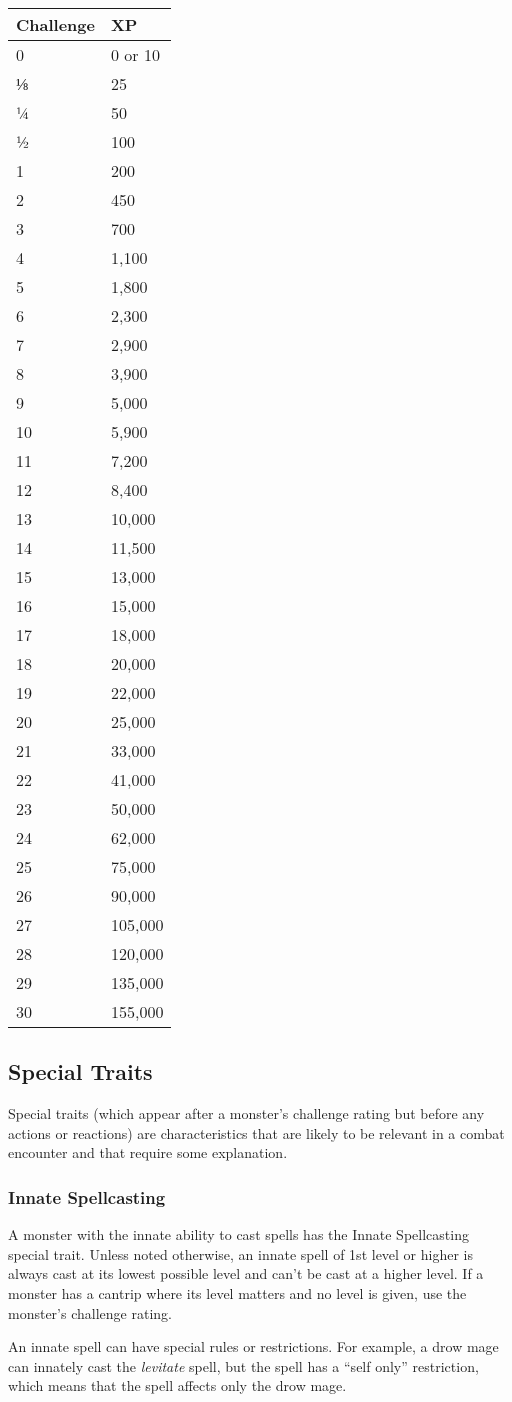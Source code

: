 \documentclass[
]{article}
\begin{document}
\begin{longtable}[]{@{}ll@{}}
\toprule
Challenge & XP\tabularnewline
\midrule
\endhead
0 & 0 or 10\tabularnewline
⅛ & 25\tabularnewline
¼ & 50\tabularnewline
½ & 100\tabularnewline
1 & 200\tabularnewline
2 & 450\tabularnewline
3 & 700\tabularnewline
4 & 1,100\tabularnewline
5 & 1,800\tabularnewline
6 & 2,300\tabularnewline
7 & 2,900\tabularnewline
8 & 3,900\tabularnewline
9 & 5,000\tabularnewline
10 & 5,900\tabularnewline
11 & 7,200\tabularnewline
12 & 8,400\tabularnewline
13 & 10,000\tabularnewline
14 & 11,500\tabularnewline
15 & 13,000\tabularnewline
16 & 15,000\tabularnewline
17 & 18,000\tabularnewline
18 & 20,000\tabularnewline
19 & 22,000\tabularnewline
20 & 25,000\tabularnewline
21 & 33,000\tabularnewline
22 & 41,000\tabularnewline
23 & 50,000\tabularnewline
24 & 62,000\tabularnewline
25 & 75,000\tabularnewline
26 & 90,000\tabularnewline
27 & 105,000\tabularnewline
28 & 120,000\tabularnewline
29 & 135,000\tabularnewline
30 & 155,000\tabularnewline
\bottomrule
\end{longtable}

\hypertarget{special-traits}{%
\subsection{Special Traits}\label{special-traits}}

Special traits (which appear after a monster's challenge rating but
before any actions or reactions) are characteristics that are likely to
be relevant in a combat encounter and that require some explanation.

\hypertarget{innate-spellcasting}{%
\subsubsection{Innate Spellcasting}\label{innate-spellcasting}}

A monster with the innate ability to cast spells has the Innate
Spellcasting special trait. Unless noted otherwise, an innate spell of
1st level or higher is always cast at its lowest possible level and
can't be cast at a higher level. If a monster has a cantrip where its
level matters and no level is given, use the monster's challenge rating.

An innate spell can have special rules or restrictions. For example, a
drow mage can innately cast the \emph{levitate} spell, but the spell has
a ``self only'' restriction, which means that the spell affects only the
drow mage.
\end{document}
